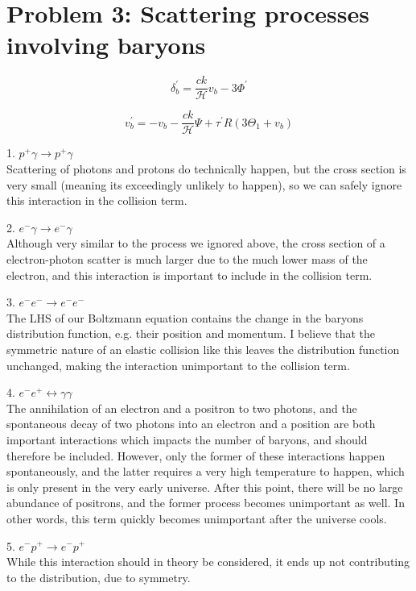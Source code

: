 \documentclass[10pt, a4paper]{article}
\begin{document}
\section*{Problem 3: Scattering processes involving baryons}

\begin{equation}
    \delta_{b}^{\prime}=\frac{c k}{\mathcal{H}} v_{b}-3 \Phi^{\prime}
\end{equation}

\begin{equation}
    v_{b}^{\prime}=-v_{b}-\frac{c k}{\mathcal{H}} \Psi+\tau^{\prime} R\left(3 \Theta_{1}+v_{b}\right)
\end{equation}


1. $p^{+} \gamma \rightarrow p^{+} \gamma$\\
Scattering of photons and protons do technically happen, but the cross section is very small (meaning its exceedingly unlikely to happen), so we can safely ignore this interaction in the collision term.

2. $e^{-} \gamma \rightarrow e^{-} \gamma$\\
Although very similar to the process we ignored above, the cross section of a electron-photon scatter is much larger due to the much lower mass of the electron, and this interaction is important to include in the collision term.

3. $e^{-} e^{-} \rightarrow e^{-} e^{-}$\\
The LHS of our Boltzmann equation contains the change in the baryons distribution function, e.g. their position and momentum. I believe that the symmetric nature of an elastic collision like this leaves the distribution function unchanged, making the interaction unimportant to the collision term.

4. $e^{-} e^{+} \leftrightarrow \gamma \gamma$\\
The annihilation of an electron and a positron to two photons, and the spontaneous decay of two photons into an electron and a position are both important interactions which impacts the number of baryons, and should therefore be included. However, only the former of these interactions happen spontaneously, and the latter requires a very high temperature to happen, which is only present in the very early universe. After this point, there will be no large abundance of positrons, and the former process becomes unimportant as well. In other words, this term quickly becomes unimportant after the universe cools.

5. $e^{-} p^{+} \rightarrow e^{-} p^{+}$\\
While this interaction should in theory be considered, it ends up not contributing to the distribution, due to symmetry.
\end{document}

